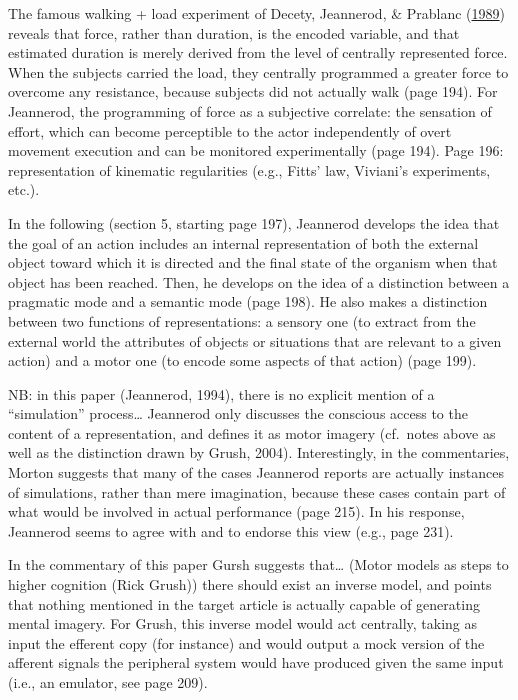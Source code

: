 \documentclass[a4paper,12pt,twoside,openright,oldfontcommands]{memoir}
\begin{document}
The famous walking + load experiment of Decety, Jeannerod, \& Prablanc (\protect\hyperlink{ref-decety_timing_1989}{1989}) reveals that force, rather than duration, is the encoded variable, and that estimated duration is merely derived from the level of centrally represented force. When the subjects carried the load, they centrally programmed a greater force to overcome any resistance, because subjects did not actually walk (page 194). For Jeannerod, the programming of force as a subjective correlate: the sensation of effort, which can become perceptible to the actor independently of overt movement execution and can be monitored experimentally (page 194). Page 196: representation of kinematic regularities (e.g., Fitts' law, Viviani's experiments, etc.).

In the following (section 5, starting page 197), Jeannerod develops the idea that the goal of an action includes an internal representation of both the external object toward which it is directed and the final state of the organism when that object has been reached. Then, he develops on the idea of a distinction between a pragmatic mode and a semantic mode (page 198). He also makes a distinction between two functions of representations: a sensory one (to extract from the external world the attributes of objects or situations that are relevant to a given action) and a motor one (to encode some aspects of that action) (page 199).

NB: in this paper (Jeannerod, 1994), there is no explicit mention of a \enquote{simulation} process\ldots{} Jeannerod only discusses the conscious access to the content of a representation, and defines it as motor imagery (cf.~notes above as well as the distinction drawn by Grush, 2004). Interestingly, in the commentaries, Morton suggests that many of the cases Jeannerod reports are actually instances of simulations, rather than mere imagination, because these cases contain part of what would be involved in actual performance (page 215). In his response, Jeannerod seems to agree with and to endorse this view (e.g., page 231).

In the commentary of this paper Gursh suggests that\ldots{} (Motor models as steps to higher cognition (Rick Grush)) there should exist an inverse model, and points that nothing mentioned in the target article is actually capable of generating mental imagery. For Grush, this inverse model would act centrally, taking as input the efferent copy (for instance) and would output a mock version of the afferent signals the peripheral system would have produced given the same input (i.e., an emulator, see page 209).
\end{document}
